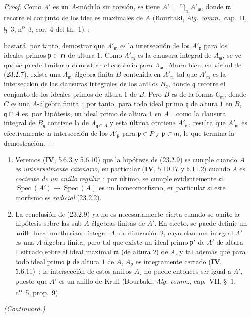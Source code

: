 \begin{proof}
Como $A'$ es un $A$-módulo sin torsión, se tiene
$A'=\bigcap_{\mathfrak m}A'_{\mathfrak m}$, donde $\mathfrak m$ recorre el conjunto de los ideales
maximales de $A$ (Bourbaki, \emph{Alg. comm.}, cap.~II, §~3,
n\textsuperscript{o}~3, cor.~4 del th.~1)~;



bastará, por tanto, demostrar que $A'_{\mathfrak m}$ es la intersección de los
$A'_{\mathfrak p}$ para los ideales primos $\mathfrak p\subset\mathfrak m$
de altura $1$. Como $A'_{\mathfrak m}$ es la clausura integral de
$A_{\mathfrak m}$, se ve que se puede limitar a demostrar el corolario para
$A_{\mathfrak m}$. Ahora bien, en virtud de (23.2.7), existe una
$A_{\mathfrak m}$-álgebra 
finita $B$ contenida en $A'_{\mathfrak m}$ tal
que $A'_{\mathfrak m}$ es la intersección de las clausuras integrales de los anillos
$B_{\mathfrak q}$, donde $\mathfrak q$ recorre el conjunto de los ideales primos de
altura $1$ de $B$. Pero $B$ es de la forma $C_{\mathfrak m}$, donde $C$ es
una $A$-álgebra finita~; por tanto, para todo ideal primo $\mathfrak q$ de altura
$1$ en $B$, $\mathfrak q\cap A$ es, por hipótesis, un ideal primo de
altura $1$ en $A$~; como la clausura integral de $B_{\mathfrak q}$
contiene la de $A_{\mathfrak q\cap A}$ y esta última contiene
$A'_{\mathfrak m}$, resulta que $A'_{\mathfrak m}$ es efectivamente
la intersección de los $A'_{\mathfrak p}$ para $\mathfrak p\in P$ y
$\mathfrak p\subset\mathfrak m$, lo que termina la demostración.
\end{proof}

\begin{remarks}[23.2.10]
\label{0.23.2.10-fr}
\begin{enumerate}
  \item[(i)] Veremos (\textbf{IV}, 5.6.3 y 5.6.10) que la hipótesis de (23.2.9)
  se cumple cuando $A$ es \emph{universalmente catenario}, en particular
  (\textbf{IV}, 5.10.17 y 5.11.2) cuando $A$ es \emph{cociente de un anillo
  regular}~; por último, se cumple evidentemente si
  $\operatorname{Spec}(A')\to\operatorname{Spec}(A)$ es un homeomorfismo,
  en particular si este morfismo es \emph{radicial} (23.2.2).

  \item[(ii)] La conclusión de (23.2.9) ya no es necesariamente cierta
  cuando se omite la hipótesis sobre las sub-$A$-álgebras finitas de $A'$. En
  efecto, se puede definir un anillo local noetheriano íntegro $A$, de dimensión
  $2$, cuya clausura integral $A'$ es una $A$-álgebra finita, pero tal que
  existe un ideal primo $\mathfrak p'$ de $A'$ de altura $1$ situado sobre
  el ideal maximal $\mathfrak m$ (de altura $2$) de $A$, y tal además que
  para todo ideal primo $\mathfrak p$ de altura $1$ de $A$,
  $A_{\mathfrak p}$ es íntegramente cerrado (\textbf{IV}, 5.6.11)~; la intersección de
  estos anillos $A_{\mathfrak p}$ no puede entonces ser igual a $A'$, puesto que $A'$
  es un anillo de Krull (Bourbaki, \emph{Alg. comm.}, cap.~VII, §~1,
  n\textsuperscript{o}~5, prop.~9).
\end{enumerate}
\end{remarks}

\begin{flushright}
\emph{(Continuará.)}
\end{flushright}
